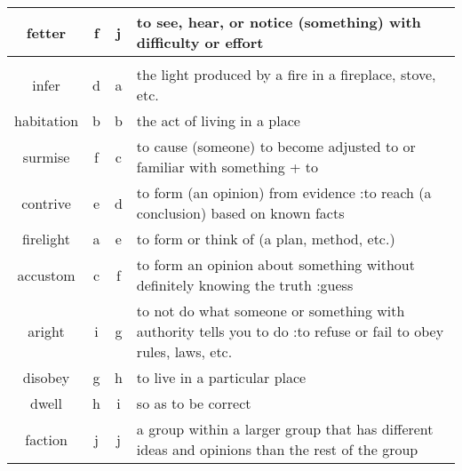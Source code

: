 \documentclass[a4paper]{article}
\begin{document}
\begin{center}
\begin{tabular}{|c|c|c|m{}|}
\hline
fetter & f & j &  to see, hear, or notice (something) with difficulty or effort \\
\hline
 & & & \\
\hline
infer & d & a &  the light produced by a fire in a fireplace, stove, etc. \\
\hline
habitation & b & b &  the act of living in a place \\
\hline
surmise & f & c &  to cause (someone) to become adjusted to or familiar with something + to \\
\hline
contrive & e & d &  to form (an opinion) from evidence :to reach (a conclusion) based on known facts \\
\hline
firelight & a & e &  to form or think of (a plan, method, etc.) \\
\hline
accustom & c & f &  to form an opinion about something without definitely knowing the truth :guess \\
\hline
aright & i & g &  to not do what someone or something with authority tells you to do :to refuse or fail to obey rules, laws, etc. \\
\hline
disobey & g & h &  to live in a particular place \\
\hline
dwell & h & i &  so as to be correct \\
\hline
faction & j & j &  a group within a larger group that has different ideas and opinions than the rest of the group \\
\hline
\end{tabular}
\end{center}
\end{document}

